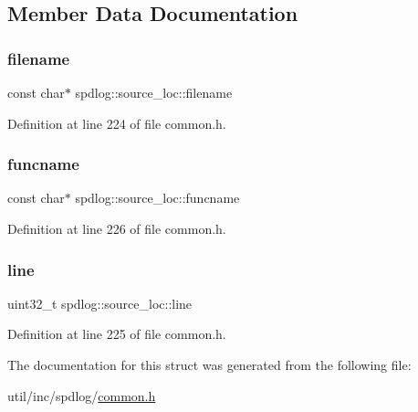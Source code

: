 \subsection{Member Data Documentation}
\mbox{\label{structspdlog_1_1source__loc_af67920703a5ba0a5557eb86667e09c80}} 
\subsubsection{\texorpdfstring{filename}{filename}}
{\footnotesize\ttfamily const char$\ast$ spdlog\+::source\+\_\+loc\+::filename}



Definition at line 224 of file common.\+h.

\mbox{\label{structspdlog_1_1source__loc_a622d48d070d0421ec91a6484923aacd2}} 
\subsubsection{\texorpdfstring{funcname}{funcname}}
{\footnotesize\ttfamily const char$\ast$ spdlog\+::source\+\_\+loc\+::funcname}



Definition at line 226 of file common.\+h.

\mbox{\label{structspdlog_1_1source__loc_a1742569c23cc7e3a01fa6de6f43cc60f}} 
\subsubsection{\texorpdfstring{line}{line}}
{\footnotesize\ttfamily uint32\+\_\+t spdlog\+::source\+\_\+loc\+::line}



Definition at line 225 of file common.\+h.



The documentation for this struct was generated from the following file\+:\begin{DoxyCompactItemize}
\item 
util/inc/spdlog/\hyperlink{common_8h}{common.\+h}\end{DoxyCompactItemize}
